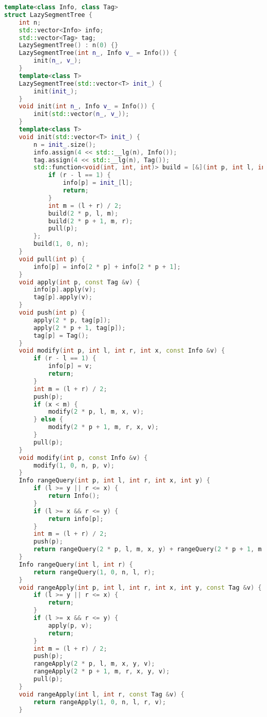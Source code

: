 \begin{lstlisting}[language=C++]
template<class Info, class Tag>
struct LazySegmentTree {
    int n;
    std::vector<Info> info;
    std::vector<Tag> tag;
    LazySegmentTree() : n(0) {}
    LazySegmentTree(int n_, Info v_ = Info()) {
        init(n_, v_);
    }
    template<class T>
    LazySegmentTree(std::vector<T> init_) {
        init(init_);
    }
    void init(int n_, Info v_ = Info()) {
        init(std::vector(n_, v_));
    }
    template<class T>
    void init(std::vector<T> init_) {
        n = init_.size();
        info.assign(4 << std::__lg(n), Info());
        tag.assign(4 << std::__lg(n), Tag());
        std::function<void(int, int, int)> build = [&](int p, int l, int r) {
            if (r - l == 1) {
                info[p] = init_[l];
                return;
            }
            int m = (l + r) / 2;
            build(2 * p, l, m);
            build(2 * p + 1, m, r);
            pull(p);
        };
        build(1, 0, n);
    }
    void pull(int p) {
        info[p] = info[2 * p] + info[2 * p + 1];
    }
    void apply(int p, const Tag &v) {
        info[p].apply(v);
        tag[p].apply(v);
    }
    void push(int p) {
        apply(2 * p, tag[p]);
        apply(2 * p + 1, tag[p]);
        tag[p] = Tag();
    }
    void modify(int p, int l, int r, int x, const Info &v) {
        if (r - l == 1) {
            info[p] = v;
            return;
        }
        int m = (l + r) / 2;
        push(p);
        if (x < m) {
            modify(2 * p, l, m, x, v);
        } else {
            modify(2 * p + 1, m, r, x, v);
        }
        pull(p);
    }
    void modify(int p, const Info &v) {
        modify(1, 0, n, p, v);
    }
    Info rangeQuery(int p, int l, int r, int x, int y) {
        if (l >= y || r <= x) {
            return Info();
        }
        if (l >= x && r <= y) {
            return info[p];
        }
        int m = (l + r) / 2;
        push(p);
        return rangeQuery(2 * p, l, m, x, y) + rangeQuery(2 * p + 1, m, r, x, y);
    }
    Info rangeQuery(int l, int r) {
        return rangeQuery(1, 0, n, l, r);
    }
    void rangeApply(int p, int l, int r, int x, int y, const Tag &v) {
        if (l >= y || r <= x) {
            return;
        }
        if (l >= x && r <= y) {
            apply(p, v);
            return;
        }
        int m = (l + r) / 2;
        push(p);
        rangeApply(2 * p, l, m, x, y, v);
        rangeApply(2 * p + 1, m, r, x, y, v);
        pull(p);
    }
    void rangeApply(int l, int r, const Tag &v) {
        return rangeApply(1, 0, n, l, r, v);
    }

\end{lstlisting}
